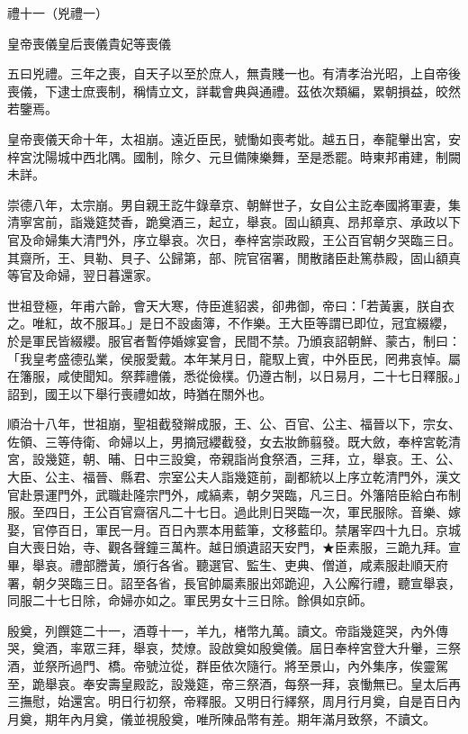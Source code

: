 
\begin{pinyinscope}
禮十一（兇禮一）

皇帝喪儀皇后喪儀貴妃等喪儀

五曰兇禮。三年之喪，自天子以至於庶人，無貴賤一也。有清孝治光昭，上自帝後喪儀，下逮士庶喪制，稱情立文，詳載會典與通禮。茲依次類編，累朝損益，皎然若鑒焉。

皇帝喪儀天命十年，太祖崩。遠近臣民，號慟如喪考妣。越五日，奉龍轝出宮，安梓宮沈陽城中西北隅。國制，除夕、元旦備陳樂舞，至是悉罷。時東邦甫建，制闕未詳。

崇德八年，太宗崩。男自親王訖牛錄章京、朝鮮世子，女自公主訖奉國將軍妻，集清寧宮前，詣幾筵焚香，跪奠酒三，起立，舉哀。固山額真、昂邦章京、承政以下官及命婦集大清門外，序立舉哀。次日，奉梓宮崇政殿，王公百官朝夕哭臨三日。其齋所，王、貝勒、貝子、公歸第，部、院官宿署，閒散諸臣赴篤恭殿，固山額真等官及命婦，翌日暮還家。

世祖登極，年甫六齡，會天大寒，侍臣進貂裘，卻弗御，帝曰：「若黃裏，朕自衣之。唯紅，故不服耳。」是日不設鹵簿，不作樂。王大臣等謂已即位，冠宜綴纓，於是軍民皆綴纓。服官者暫停婚嫁宴會，民間不禁。乃頒哀詔朝鮮、蒙古，制曰：「我皇考盛德弘業，侯服愛戴。本年某月日，龍馭上賓，中外臣民，罔弗哀悼。屬在籓服，咸使聞知。祭葬禮儀，悉從儉樸。仍遵古制，以日易月，二十七日釋服。」詔到，國王以下舉行喪禮如故，時猶在關外也。

順治十八年，世祖崩，聖祖截發辮成服，王、公、百官、公主、福晉以下，宗女、佐領、三等侍衛、命婦以上，男摘冠纓截發，女去妝飾翦發。既大斂，奉梓宮乾清宮，設幾筵，朝、晡、日中三設奠，帝親詣尚食祭酒，三拜，立，舉哀。王、公、大臣、公主、福晉、縣君、宗室公夫人詣幾筵前，副都統以上序立乾清門外，漢文官赴景運門外，武職赴隆宗門外，咸縞素，朝夕哭臨，凡三日。外籓陪臣給白布制服。至四日，王公百官齋宿凡二十七日。過此則日哭臨一次，軍民服除。音樂、嫁娶，官停百日，軍民一月。百日內票本用藍筆，文移藍印。禁屠宰四十九日。京城自大喪日始，寺、觀各聲鐘三萬杵。越日頒遺詔天安門，★臣素服，三跪九拜。宣畢，舉哀。禮部謄黃，頒行各省。聽選官、監生、吏典、僧道，咸素服赴順天府署，朝夕哭臨三日。詔至各省，長官帥屬素服出郊跪迎，入公廨行禮，聽宣舉哀，同服二十七日除，命婦亦如之。軍民男女十三日除。餘俱如京師。

殷奠，列饌筵二十一，酒尊十一，羊九，楮幣九萬。讀文。帝詣幾筵哭，內外傳哭，奠酒，率眾三拜，舉哀，焚燎。設啟奠如殷奠儀。屆日奉梓宮登大升轝，三祭酒，並祭所過門、橋。帝號泣從，群臣依次隨行。將至景山，內外集序，俟靈駕至，跪舉哀。奉安壽皇殿訖，設幾筵，帝三祭酒，每祭一拜，哀慟無已。皇太后再三撫慰，始還宮。明日行初祭，帝釋服。又明日行繹祭，周月行月奠，自是百日內月奠，期年內月奠，儀並視殷奠，唯所陳品幣有差。期年滿月致祭，不讀文。


\end{pinyinscope}
